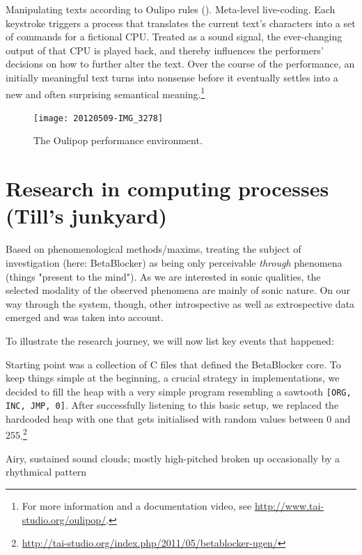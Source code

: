 \documentclass[letterpaper, 12pt]{article}
\begin{document}
Manipulating texts according to Oulipo rules (\cite{mathews2005-oul}).
Meta-level live-coding. 
Each keystroke triggers a process that translates the current text's characters into a set of commands for a fictional CPU. 
Treated as a sound signal, the ever-changing output of that CPU is played back, and thereby influences the performers' decisions on how to further alter the text. 
Over the course of the performance, an initially meaningful text turns into nonsense before it eventually settles into a new and often surprising semantical meaning.\footnote{For more information and a documentation video, see \url{http://www.tai-studio.org/oulipop/}.}
\begin{figure}
	\centering
		\texttt{[image: 20120509-IMG\_3278]}
	\caption{The Oulipop performance environment.}
	\label{fig:fig_20120509-IMG_3278}
\end{figure}


\section{Research in computing processes (Till's junkyard)}
\label{sub:research_in_computing_processes}

Based on phenomenological methods/maxims, treating the subject of investigation (here: BetaBlocker) as being only perceivable \emph{through} phenomena (things "present to the mind"). 
As we are interested in sonic qualities, the selected modality of the observed phenomena are mainly of sonic nature.
On our way through the system, though, other introspective as well as extrospective data emerged and was taken into account.

To illustrate the research journey, we will now list key events that happened:

Starting point was a collection of C files that defined the BetaBlocker core.
To keep things simple at the beginning, a crucial strategy in implementations, we decided to fill the heap with a very simple program resembling a sawtooth \verb#[ORG, INC, JMP, 0]#. 
After successfully listening to this basic setup, we replaced the hardcoded heap with one that gets initialised with random values between $0$ and $255$.\footnote{\url{http://tai-studio.org/index.php/2011/05/betablocker-ugen/}}


Airy, sustained sound clouds; mostly high-pitched broken up occasionally by a rhythmical pattern
\end{document}
